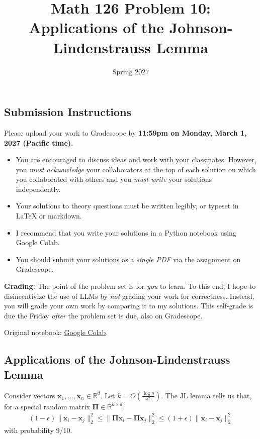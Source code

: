 \documentclass{article}
\title{Math 126 Problem 10: Applications of the Johnson-Lindenstrauss Lemma}
\author{} %
\date{Spring 2027}
\begin{document}
\maketitle

\hypertarget{submission-instructions}{%
\subsection*{Submission Instructions}\label{submission-instructions}}

Please upload your work to Gradescope by \textbf{11:59pm on Monday, March 1, 2027 (Pacific time).}

\begin{itemize}
\item
  You are encouraged to discuss ideas and work with your classmates. However, you \emph{must acknowledge} your collaborators at the top of each solution on which you collaborated with others and you \emph{must write} your solutions independently.
\item
  Your solutions to theory questions must be written legibly, or typeset in LaTeX or markdown.
\item
  I recommend that you write your solutions in a Python notebook using Google Colab.
\item
  You should submit your solutions as a \emph{single PDF} via the assignment on Gradescope.
\end{itemize}

\textbf{Grading:} The point of the problem set is for \emph{you} to learn. To this end, I hope to disincentivize the use of LLMs by \emph{not} grading your work for correctness. Instead, you will grade your own work by comparing it to my solutions. This self-grade is due the Friday \emph{after} the problem set is due, also on Gradescope.

\noindent Original notebook: \href{https://colab.research.google.com/drive/1fzNpF5fdn_7jALETy3NqZkmSRAnzqt1N?usp=sharing}{Google Colab}.

\hypertarget{applications-of-the-johnson-lindenstrauss-lemma}{%
\subsection*{Applications of the Johnson-Lindenstrauss Lemma}\label{applications-of-the-johnson-lindenstrauss-lemma}}

Consider vectors \(\mathbf{x}_1, \ldots, \mathbf{x}_n \in \mathbb{R}^d\). Let \(k = O\left( \frac{\log n}{\epsilon^2} \right)\). The JL lemma tells us that, for a special random matrix \(\mathbf{\Pi} \in \mathbb{R}^{k \times d}\), \begin{align*}
(1-\epsilon) \| \mathbf{x}_i - \mathbf{x}_j \|_2^2
\leq \| \mathbf{\Pi x}_i - \mathbf{\Pi x}_j \|_2^2
\leq (1+\epsilon) \| \mathbf{x}_i - \mathbf{x}_j \|_2^2
\end{align*} with probability 9/10.
\end{document}
